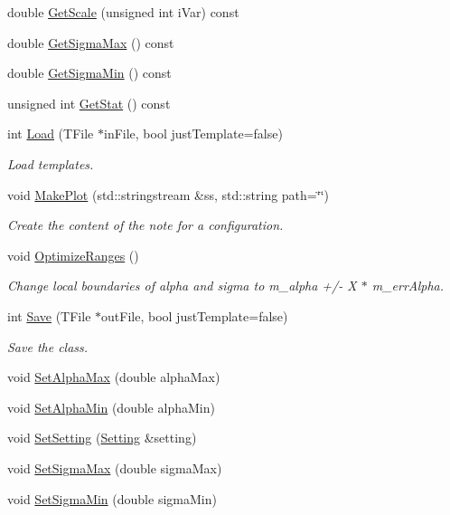 \begin{DoxyCompactItemize}
\item 
double \hyperlink{classTemplateMethod_1_1ChiMatrix_aacd8ffa0a8a3ec2811a79c95fbdf5099}{Get\+Scale} (unsigned int i\+Var) const 
\item 
double \hyperlink{classTemplateMethod_1_1ChiMatrix_aadebbffe51827c59405f671a39f8e81d}{Get\+Sigma\+Max} () const 
\item 
double \hyperlink{classTemplateMethod_1_1ChiMatrix_aa417bf2b1b514aaeaea1c20a602bc4fc}{Get\+Sigma\+Min} () const 
\item 
unsigned int \hyperlink{classTemplateMethod_1_1ChiMatrix_a60aff279bfa3380ef7e21dba3b1ef8c7}{Get\+Stat} () const 
\item 
int \hyperlink{classTemplateMethod_1_1ChiMatrix_a4dfa575f42bc4a32698edee7375366aa}{Load} (T\+File $\ast$in\+File, bool just\+Template=false)
\begin{DoxyCompactList}\small\item\em Load templates. \end{DoxyCompactList}\item 
void \hyperlink{classTemplateMethod_1_1ChiMatrix_acfd8bcf83b37322001d7a9785085dbc3}{Make\+Plot} (std\+::stringstream \&ss, std\+::string path=\char`\"{}\char`\"{})
\begin{DoxyCompactList}\small\item\em Create the content of the note for a configuration. \end{DoxyCompactList}\item 
void \hyperlink{classTemplateMethod_1_1ChiMatrix_afe2c3e7293849895bf8a70e42345673b}{Optimize\+Ranges} ()
\begin{DoxyCompactList}\small\item\em Change local boundaries of alpha and sigma to m\+\_\+alpha +/-\/ X $\ast$ m\+\_\+err\+Alpha. \end{DoxyCompactList}\item 
int \hyperlink{classTemplateMethod_1_1ChiMatrix_a0194a73858e07d6fd53233b00a9888a3}{Save} (T\+File $\ast$out\+File, bool just\+Template=false)
\begin{DoxyCompactList}\small\item\em Save the class. \end{DoxyCompactList}\item 
void \hyperlink{classTemplateMethod_1_1ChiMatrix_a42e4cbfba12932fa3a6b95f5791909ff}{Set\+Alpha\+Max} (double alpha\+Max)
\item 
void \hyperlink{classTemplateMethod_1_1ChiMatrix_ab8f4e8f38e46931eb2c6aef550a38363}{Set\+Alpha\+Min} (double alpha\+Min)
\item 
void \hyperlink{classTemplateMethod_1_1ChiMatrix_ac86b4c7aa8548b4a76e4ebbeae94d16b}{Set\+Setting} (\hyperlink{classTemplateMethod_1_1Setting}{Setting} \&setting)
\item 
void \hyperlink{classTemplateMethod_1_1ChiMatrix_a194bf240dd8abeae58ff62149db42703}{Set\+Sigma\+Max} (double sigma\+Max)
\item 
void \hyperlink{classTemplateMethod_1_1ChiMatrix_a0e8cd30fe72eed3cf3de67c6830926df}{Set\+Sigma\+Min} (double sigma\+Min)
\end{DoxyCompactItemize}
